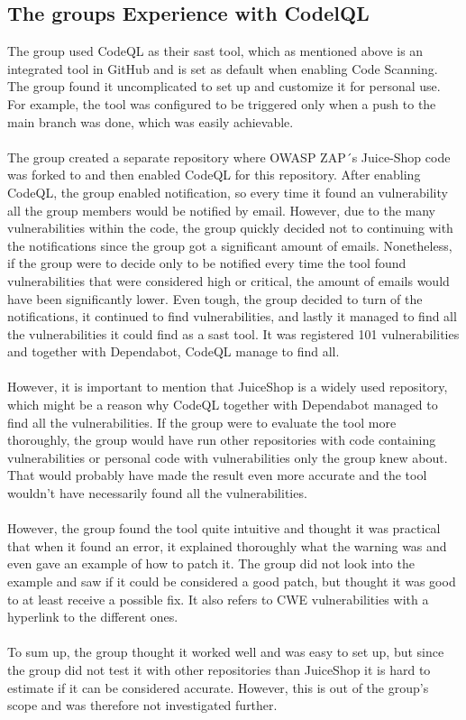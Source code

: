 \subsection{The groups Experience with CodelQL}
The group used CodeQL as their \acrshort{sast} tool, which as mentioned above is an integrated tool in GitHub and is set as default when enabling Code Scanning. The group found it uncomplicated to set up and customize it for personal use. For example, the tool was configured to be triggered only when a push to the main branch was done, which was easily achievable. 
\\~\\
The group created a separate repository where OWASP ZAP´s Juice-Shop code was forked to and then enabled CodeQL for this repository. After enabling CodeQL, the group enabled notification, so every time it found an vulnerability all the group members would be notified by email. However, due to the many vulnerabilities within the code, the group quickly decided not to continuing with the notifications since the group got a significant amount of emails. Nonetheless, if the group were to decide only to be notified every time the tool found vulnerabilities that were considered high or critical, the amount of emails would have been significantly lower. Even tough, the group decided to turn of the notifications, it continued to find vulnerabilities, and lastly it managed to find all the vulnerabilities it could find as a \acrshort{sast} tool. It was registered 101 vulnerabilities and together with Dependabot, CodeQL manage to find all.  
\\~\\
However, it is important to mention that JuiceShop is a widely used repository, which might be a reason why CodeQL together with Dependabot managed to find all the vulnerabilities. If the group were to evaluate the tool more thoroughly, the group would have run other repositories with code containing vulnerabilities or personal code with vulnerabilities only the group knew about. That would probably have made the result even more accurate and the tool wouldn't have necessarily found all the vulnerabilities. 
\\~\\
However, the group found the tool quite intuitive and thought it was practical that when it found an error, it explained thoroughly what the warning was and even gave an example of how to patch it. The group did not look into the example and saw if it could be considered a good patch, but thought it was good to at least receive a possible fix. It also refers to CWE vulnerabilities with a hyperlink to the different ones. 
\\~\\
To sum up, the group thought it worked well and was easy to set up, but since the group did not test it with other repositories than JuiceShop it is hard to estimate if it can be considered accurate. However, this is out of the group's scope and was therefore not investigated further. 




